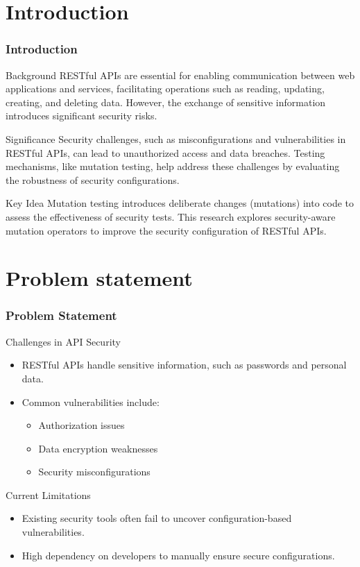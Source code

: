 \documentclass[12pt]{beamer}
\theoremstyle{remark}
\theoremstyle{definition}
\begin{document}
\section{Introduction}
\begin{frame}[allowframebreaks]
\frametitle{Introduction}
\begin{block}{Background}
RESTful APIs are essential for enabling communication between web applications and services, facilitating operations such as reading, updating, creating, and deleting data. However, the exchange of sensitive information introduces significant security risks.
\end{block}

\begin{block}{Significance}
Security challenges, such as misconfigurations and vulnerabilities in RESTful APIs, can lead to unauthorized access and data breaches. Testing mechanisms, like mutation testing, help address these challenges by evaluating the robustness of security configurations.
\end{block}

\begin{block}{Key Idea}
Mutation testing introduces deliberate changes (mutations) into code to assess the effectiveness of security tests. This research explores security-aware mutation operators to improve the security configuration of RESTful APIs.
\end{block}
\end{frame}

\section{Problem statement}


\begin{frame}[allowframebreaks]
\frametitle{Problem Statement}
\begin{block}{Challenges in API Security}
\begin{itemize}
    \item RESTful APIs handle sensitive information, such as passwords and personal data.
    \item Common vulnerabilities include:
    \begin{itemize}
        \item Authorization issues
        \item Data encryption weaknesses
        \item Security misconfigurations
    \end{itemize}
\end{itemize}
\end{block}

\begin{block}{Current Limitations}
\begin{itemize}
    \item Existing security tools often fail to uncover configuration-based vulnerabilities.
    \item High dependency on developers to manually ensure secure configurations.
\end{itemize}
\end{block}
\end{frame}
\end{document}
